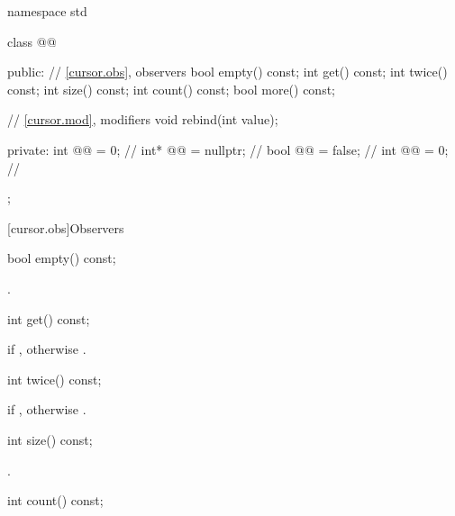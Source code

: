 \begin{codeblock}
namespace std {
  class @@ {
  public:
    // \ref{cursor.obs}, observers
    bool empty() const;
    int get() const;
    int twice() const;
    int size() const;
    int count() const;
    bool more() const;

    // \ref{cursor.mod}, modifiers
    void rebind(int value);

  private:
    int @@ = 0;         // \expos
    int* @@ = nullptr;    // \expos
    bool @@ = false; // \expos
    int @@ = 0;         // \expos
  };
}
\end{codeblock}

[cursor.obs]{Observers}

%
\begin{itemdecl}
bool empty() const;
\end{itemdecl}

\begin{itemdescr}
\pnum
\returns
{}.
\end{itemdescr}

%
\begin{itemdecl}
int get() const;
\end{itemdecl}

\begin{itemdescr}
\pnum
\returns
{} if , otherwise .
\end{itemdescr}

%
\begin{itemdecl}
int twice() const;
\end{itemdecl}

\begin{itemdescr}
\pnum
\returns
{} if , otherwise .
\end{itemdescr}

%
\begin{itemdecl}
int size() const;
\end{itemdecl}

\begin{itemdescr}
\pnum
\returns
{}.
\end{itemdescr}

%
\begin{itemdecl}
int count() const;
\end{itemdecl}

